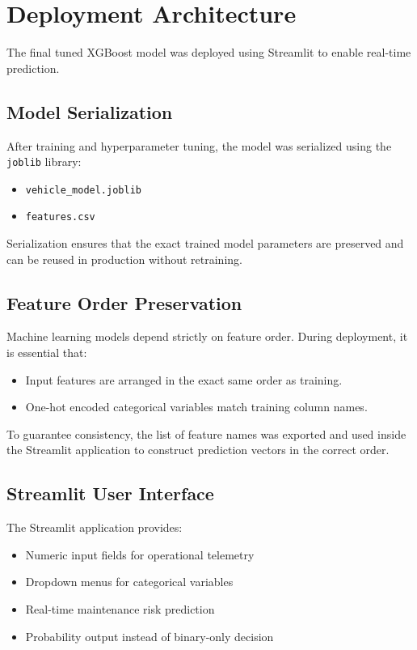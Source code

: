 \documentclass[12pt, a4paper]{article}
\begin{document}
\section{Deployment Architecture}

The final tuned XGBoost model was deployed using Streamlit to enable real-time prediction.

\subsection{Model Serialization}

After training and hyperparameter tuning, the model was serialized using the \texttt{joblib} library:

\begin{itemize}
\item \texttt{vehicle\_model.joblib}
\item \texttt{features.csv}
\end{itemize}

Serialization ensures that the exact trained model parameters are preserved and can be reused in production without retraining.

\subsection{Feature Order Preservation}

Machine learning models depend strictly on feature order. During deployment, it is essential that:

\begin{itemize}
\item Input features are arranged in the exact same order as training.
\item One-hot encoded categorical variables match training column names.
\end{itemize}

To guarantee consistency, the list of feature names was exported and used inside the Streamlit application to construct prediction vectors in the correct order.

\subsection{Streamlit User Interface}

The Streamlit application provides:

\begin{itemize}
\item Numeric input fields for operational telemetry
\item Dropdown menus for categorical variables
\item Real-time maintenance risk prediction
\item Probability output instead of binary-only decision
\end{itemize}
\end{document}
